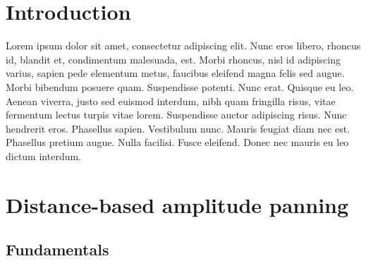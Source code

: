 \documentclass[twoside,10pt]{article}
\title{\papertitle}
\begin{document}
    
\maketitle




%
%




\begin{abstract}
The abstract should be placed at the top left column and should contain
about 150 words.
\end{abstract}








%
%


\section{Introduction}\label{sec:introduction}

Lorem ipsum dolor sit amet, consectetur adipiscing elit. Nunc eros libero, rhoncus id, blandit et, condimentum malesuada, est. Morbi rhoncus, nisl id adipiscing varius, sapien pede elementum metus, faucibus eleifend magna felis sed augue. Morbi bibendum posuere quam. Suspendisse potenti. Nunc erat. Quisque eu leo. Aenean viverra, justo sed euismod interdum, nibh quam fringilla risus, vitae fermentum lectus turpis vitae lorem. Suspendisse auctor adipiscing risus. Nunc hendrerit eros. Phasellus sapien. Vestibulum nunc. Mauris feugiat diam nec est. Phasellus pretium augue. Nulla facilisi. Fusce eleifend. Donec nec mauris eu leo dictum interdum. 




%
%

\section{Distance-based amplitude panning}

\subsection{Fundamentals}
\end{document}
